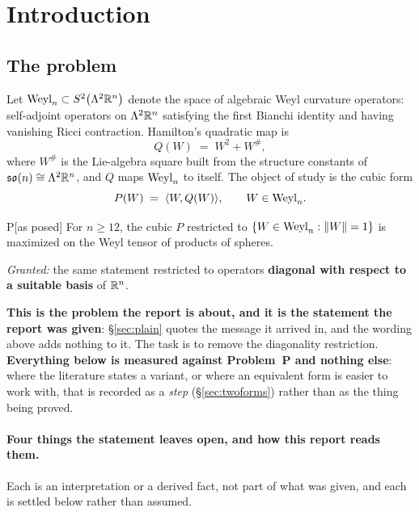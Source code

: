 \section{Introduction}\label{sec:formal}

\subsection{The problem}\label{sec:problem}

Let $\mathrm{Weyl}_n\subset S^2\big(\Lambda^2\mathbb{R}^n\big)$ denote the space of algebraic Weyl curvature operators: self-adjoint operators on $\Lambda^2\mathbb{R}^n$ satisfying the first Bianchi identity and having vanishing Ricci contraction. Hamilton's quadratic map is
\[
Q(W)\;=\;W^2+W^{\#},
\]
where $W^{\#}$ is the Lie-algebra square built from the structure constants of $\mathfrak{so}(n)\cong\Lambda^2\mathbb{R}^n$, and $Q$ maps $\mathrm{Weyl}_n$ to itself. The object of study is the cubic form
\[
P(W)\;=\;\langle W,Q(W)\rangle,\qquad W\in\mathrm{Weyl}_n .
\]

\begin{Prob}{P}[as posed]\label{prob:P}
For $n\ge12$, the cubic $P$ restricted to $\{W\in\mathrm{Weyl}_n:\|W\|=1\}$ is maximized on the Weyl tensor of products of spheres.

\emph{Granted:} the same statement restricted to operators \textbf{diagonal with respect to a suitable basis} of $\mathbb{R}^n$.
\end{Prob}

\textbf{This is the problem the report is about, and it is the statement the report was given}: \S\ref{sec:plain} quotes the message it arrived in, and the wording above adds nothing to it. The task is to remove the diagonality restriction. \textbf{Everything below is measured against Problem~P and nothing else}: where the literature states a variant, or where an equivalent form is easier to work with, that is recorded as a \emph{step} (\S\ref{sec:twoforms}) rather than as the thing being proved.

\paragraph{Four things the statement leaves open, and how this report reads them.} Each is an interpretation or a derived fact, not part of what was given, and each is settled below rather than assumed.

